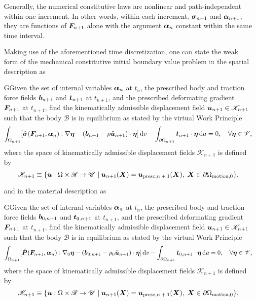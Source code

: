 Generally, the numerical constitutive laws are nonlinear and path-independent within one increment.
In other words, within each increment, $\bm{\sigma}_{n+1}$ and $\bm{\alpha}_{n+1}$, they are functions of $\bm{F}_{n+1}$ alone with the argument $\bm{\alpha}_n$ constant within the same time interval.

Making use of the aforementioned time discretization, one can state the weak form of the mechanical constitutive initial boundary value problem in the spatial description as
\begin{problem}
    GGiven the set of internal variables $\bm{\alpha}_n$ at $t_n$, the prescribed body and traction force fields $\bm{b}_{n+1}$ and $\bm{t}_{n+1}$ at $t_{n+1}$, and the prescribed deformating gradient $\bm{F}_{n+1}$ at $t_{n+1}$, find the kinematically admissible displacement field $\bm{u}_{n+1}\in\mathscr{K}_{n+1}$ such that the body $\mathscr{B}$ is in equilibrium as stated by the virtual Work Principle
            \begin{equation}
        \int_{\Omega_{n+1}} [\hat{\bm{\sigma}}(\bm{F}_{n+1}, \bm{\alpha}_n):\nabla \bm{\eta} - (\bm{b}_{n+1}-\rho\ddot{\bm u}_{n+1})\cdot \bm{\eta}]\,\mathrm{d} v - \int_{\partial\Omega_{n+1}} \bm{t}_{n+1}\cdot \bm{\eta}\,\mathrm{d} a = 0,\quad \forall \bm{\eta} \in \mathscr{V},
    \end{equation}
    where the space of kinematically admissible displacement fields $\mathscr{K}_{n+1}$ is defined by
    \begin{equation}
            \mathscr{K}_{n+1}\equiv \{\bm{u}:\Omega\times \mathscr{R}\to \mathscr{U}\;|\;\bm{u}_{n+1}(\bm{X}) = \bm{u}_\text{presc,$n+1$}(\bm{X}),\;\bm{X}\in\partial \Omega_\text{motion,0}\}.
    \end{equation}
\end{problem}
and in the material description as
\begin{problem}
    GGiven the set of internal variables $\bm{\alpha}_n$ at $t_n$, the prescribed body and traction force fields $\bm{b}_{0,n+1}$ and $\bm{t}_{0,n+1}$ at $t_{n+1}$, and the prescribed deformating gradient $\bm{F}_{n+1}$ at $t_{n+1}$, find the kinematically admissible displacement field $\bm{u}_{n+1}\in\mathscr{K}_{n+1}$ such that the body $\mathscr{B}$ is in equilibrium as stated by the virtual Work Principle
            \begin{equation}
        \int_{\Omega_{n+1}} [\hat{\bm{P}}(\bm{F}_{n+1}, \bm{\alpha}_n):\nabla_0 \bm{\eta} - (\bm{b}_{0,n+1}-\rho_0\ddot{\bm u}_{n+1})\cdot \bm{\eta}]\,\mathrm{d} v - \int_{\partial\Omega_{n+1}} \bm{t}_{0,n+1}\cdot \bm{\eta}\,\mathrm{d} a = 0,\quad \forall \bm{\eta} \in \mathscr{V},
    \end{equation}
    where the space of kinematically admissible displacement fields $\mathscr{K}_{n+1}$ is defined by
    \begin{equation}
            \mathscr{K}_{n+1}\equiv \{\bm{u}:\Omega\times \mathscr{R}\to \mathscr{U}\;|\;\bm{u}_{n+1}(\bm{X}) = \bm{u}_\text{presc,$n+1$}(\bm{X}),\;\bm{X}\in\partial \Omega_\text{motion,0}\}.
    \end{equation}
\end{problem}

